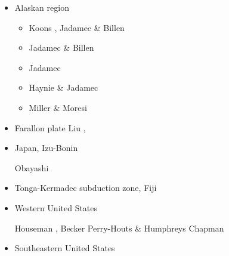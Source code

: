 \begin{itemize}
\item{Alaskan region} 

\begin{scriptsize}
\begin{itemize}
\item[\twothousandten] Koons \etal \cite{kohp10}, Jadamec \& Billen \cite{jabi10a}
\item[\twothousandtwelve] Jadamec \& Billen \cite{jabi12}
\item[\twothousandthirteen] Jadamec \etal \cite{jabr13}
\item[\twothousandseventeen] Haynie \& Jadamec \cite{haja17}
\item[\twothousandeighteen] Miller \& Moresi \cite{mimo18}
\end{itemize}
\end{scriptsize}

\item{Farallon plate} 
{\scriptsize
Liu \etal \cite{lisg08},
\cite{list11}
\cite{list12}
\cite{licu16}
}
\item{Japan, Izu-Bonin} 

\begin{scriptsize}
\cite{hond85}
\cite{lohd07}
Obayashi \etal \cite{obyf09}\\
\cite{vakn12}
\cite{musi13}
\cite{kigk14}\cite{leli14}\cite{mova14}\cite{hond14}
\cite{kilk15}
\cite{yagz17}
\cite{yamg19}
\cite{mapg20}
\end{scriptsize}

\item{Tonga-Kermadec subduction zone, Fiji} 

\begin{scriptsize}
\cite{bigs03}\cite{bigu03}
\cite{zhpy06}
\end{scriptsize}

\item{Western United States}


\begin{scriptsize}
Houseman \etal \cite{honk00},
Becker \etal \cite{besb06}
Perry-Houts \& Humphreys \cite{pehu18}
Chapman \cite{chap21}
\end{scriptsize}


\item{Southeastern United States}


\end{itemize}
